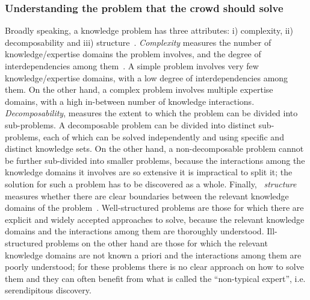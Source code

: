 \documentclass[10pt,twocolumn,letterpaper]{article}
\begin{document}
\subsubsection{Understanding the problem that the crowd should solve}
Broadly speaking, a knowledge problem has three attributes: i) complexity, ii) decomposability and iii) structure~\cite{SchmitzLykourentzou2018}. \textit{Complexity} measures the number of knowledge/expertise domains the problem involves, and the degree of interdependencies among them~\cite{Nickerson2004}. A simple problem involves very few knowledge/expertise domains, with a low degree of interdependencies among them.  On the other hand, a complex problem involves multiple expertise domains, with a high in-between number of knowledge interactions. \textit{Decomposability}, measures the extent to which the problem can be divided into sub-problems. A decomposable problem can be divided into distinct sub-problems, each of which can be solved independently and using specific and distinct knowledge sets. On the other hand, a non-decomposable problem cannot be further sub-divided into smaller problems, because the interactions among the knowledge domains it involves are so extensive it is impractical to split it; the solution for such a problem has to be discovered as a whole. Finally, ~\textit{structure} measures whether there are clear boundaries between the relevant knowledge domains of the problem~\cite{Holden2016}. Well-structured problems are those for which there are explicit and widely accepted approaches to solve, because the relevant knowledge domains and the interactions among them are thoroughly understood. Ill-structured problems on the other hand are those for which the relevant knowledge domains are not known a priori and the interactions among them are poorly understood; for these problems there is no clear approach on how to solve them and they can often benefit from what is called the “non-typical expert”, i.e. serendipitous discovery. 
\end{document}

